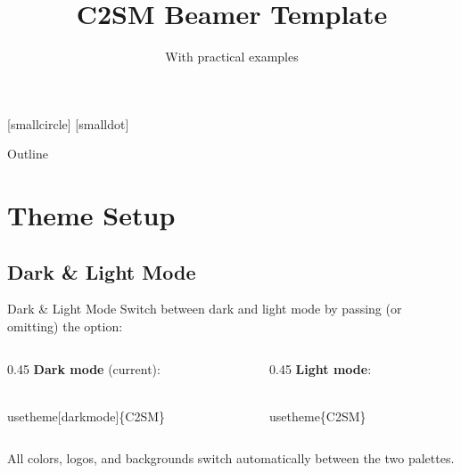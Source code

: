 \documentclass[presentation, aspectratio=169]{beamer}
\date{\mydate}
\title{C2SM Beamer Template}
\subtitle{With practical examples}
\begin{document}
\maketitle

\begingroup%
[smallcircle]%
[smalldot]%
\begin{frame}{Outline}
  \tableofcontents[hideallsubsections]
\end{frame}%
\endgroup

\section{Theme Setup}

\subsection{Dark \& Light Mode}

\begin{frame}[fragile]{Dark \& Light Mode}
  Switch between dark and light mode by passing (or omitting) the  option:

  \vspace{0.4em}
  \begin{columns}
    \begin{column}{0.45\columnwidth}
      \textbf{Dark mode} (current):
\begin{codeblock}
\\usetheme\alert{[darkmode]}\{C2SM\}
\end{codeblock}
    \end{column}
    \begin{column}{0.45\columnwidth}
      \textbf{Light mode}:
\begin{codeblock}
\\usetheme\{C2SM\}
\end{codeblock}
    \end{column}
  \end{columns}

  \vspace{0.4em}
  All colors, logos, and backgrounds switch automatically between the two palettes.
\end{frame}
\end{document}
